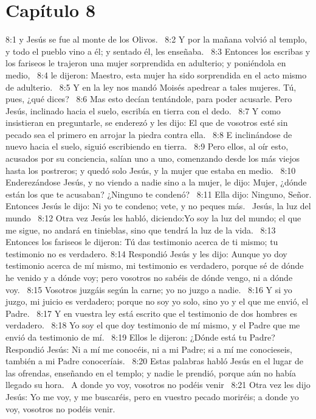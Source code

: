 \section*{Capítulo 8}

8:1 y Jesús se fue al monte de los Olivos.  
8:2 Y por la mañana volvió al templo, y todo el pueblo vino a él; y sentado él, les enseñaba.  
8:3 Entonces los escribas y los fariseos le trajeron una mujer sorprendida en adulterio; y poniéndola en medio,  
8:4 le dijeron: Maestro, esta mujer ha sido sorprendida en el acto mismo de adulterio.  
8:5 Y en la ley nos mandó Moisés apedrear a tales mujeres. Tú, pues, ¿qué dices?  
8:6 Mas esto decían tentándole, para poder acusarle. Pero Jesús, inclinado hacia el suelo, escribía en tierra con el dedo.  
8:7 Y como insistieran en preguntarle, se enderezó y les dijo: El que de vosotros esté sin pecado sea el primero en arrojar la piedra contra ella.  
8:8 E inclinándose de nuevo hacia el suelo, siguió escribiendo en tierra.  
8:9 Pero ellos, al oír esto, acusados por su conciencia, salían uno a uno, comenzando desde los más viejos hasta los postreros; y quedó solo Jesús, y la mujer que estaba en medio.  
8:10 Enderezándose Jesús, y no viendo a nadie sino a la mujer, le dijo: Mujer, ¿dónde están los que te acusaban? ¿Ninguno te condenó?  
8:11 Ella dijo: Ninguno, Señor. Entonces Jesús le dijo: Ni yo te condeno; vete, y no peques más.  
Jesús, la luz del mundo  
8:12 Otra vez Jesús les habló, diciendo:Yo soy la luz del mundo; el que me sigue, no andará en tinieblas, sino que tendrá la luz de la vida.  
8:13 Entonces los fariseos le dijeron: Tú das testimonio acerca de ti mismo; tu testimonio no es verdadero. 
8:14 Respondió Jesús y les dijo: Aunque yo doy testimonio acerca de mí mismo, mi testimonio es verdadero, porque sé de dónde he venido y a dónde voy; pero vosotros no sabéis de dónde vengo, ni a dónde voy.  
8:15 Vosotros juzgáis según la carne; yo no juzgo a nadie.  
8:16 Y si yo juzgo, mi juicio es verdadero; porque no soy yo solo, sino yo y el que me envió, el Padre.  
8:17 Y en vuestra ley está escrito que el testimonio de dos hombres es verdadero.  
8:18 Yo soy el que doy testimonio de mí mismo, y el Padre que me envió da testimonio de mí.  
8:19 Ellos le dijeron: ¿Dónde está tu Padre? Respondió Jesús: Ni a mí me conocéis, ni a mi Padre; si a mí me conocieseis, también a mi Padre conoceríais.  
8:20 Estas palabras habló Jesús en el lugar de las ofrendas, enseñando en el templo; y nadie le prendió, porque aún no había llegado su hora.  
A donde yo voy, vosotros no podéis venir  
8:21 Otra vez les dijo Jesús: Yo me voy, y me buscaréis, pero en vuestro pecado moriréis; a donde yo voy, vosotros no podéis venir.  
